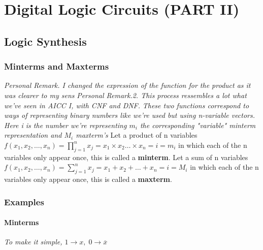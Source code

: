 \documentclass[12pt,openany, tikz,border=10pt]{book}
\begin{document}
\begin{multicols}{3}
            \end{multicols} %
            
        
        
\chapter{Digital Logic Circuits (PART II)}
\section{Logic Synthesis}
\subsection{Minterms and Maxterms}
\textit{Personal Remark. I changed the expression of the function for the product as it was clearer to my sens} \newline
\vspace{10px}
\textit{Personal Remark.2. This process ressembles a lot what we've seen in AICC I, with CNF and DNF.} \newline
\vspace{10px}
\textit{These two functions correspond to ways of representing binary numbers like we're used but using n-variable vectors. Here i is the number we're representing $m_i$ the corresponding "variable" minterm representation and $M_i$ maxterm's}\newline
\vspace{10px}
Let a product of n variables $f(x_{1}, x_{2}, \ldots, x_{n}) = \prod_{j=1}^{n}x_{j} = x_{1} \times x_{2} \ldots \times x_n = i = m_i$ in which each of the n variables only appear once, this is called a \textbf{minterm}. \newline
\vspace{5px}
Let a sum of n variables $f(x_{1}, x_{2}, \ldots, x_{n}) = \sum_{j=1}^{n}x_{j} = x_{1} + x_{2} + \ldots + x_n = i = M_i$ in which each of the n variables only appear once, this is called a \textbf{maxterm}. \newline

\vspace*{-10px}
\subsection{Examples}
\subsubsection*{Minterms}
\textit{To make it simple, $1 \rightarrow x, \; 0 \rightarrow \overline{x} $} \newline
\end{document}

